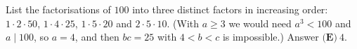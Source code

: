 List the factorisations of $100$ into three distinct factors in increasing order: $1\cdot2\cdot50$, $1\cdot4\cdot25$, $1\cdot5\cdot20$ and $2\cdot5\cdot10$. (With $a\ge3$ we would need $a^3<100$ and $a\mid100$, so $a=4$, and then $bc=25$ with $4<b<c$ is impossible.) Answer $\boxed{\textbf{(E)}\ 4}$.

